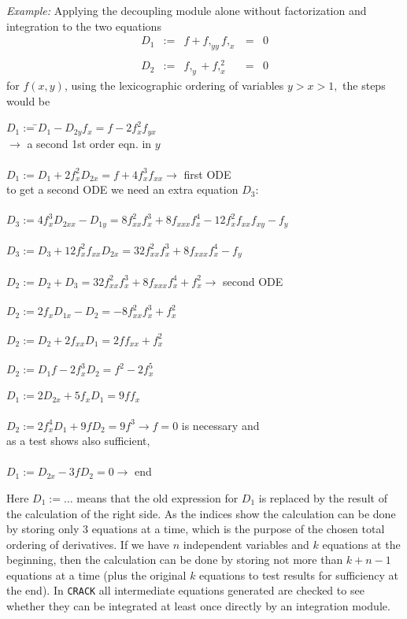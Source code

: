 {\em Example:}
Applying the decoupling module alone without factorization and integration
to the two equations
\[ \begin{array}{rclcl}
 D_1 & := & f + f,_{yy}f,_x & = & 0 \\ \\
 D_2 & := & f,_y + f,_x^2   & = & 0
\end{array} \]
for $f(x,y)$, using the lexicographic ordering of variables $y>x>1,$
the steps would be
\begin{tabbing}
$D_1:=$\=$D_1-D_{2y}f_x=f-2f_x^2f_{yx}$ \\
     \> $\rightarrow$  a second 1st order eqn. in $y$\\ \\
$D_1:=$\>$D_1+2f_x^2D_{2x}=f+4f_x^3f_{xx} \rightarrow$  first ODE \\
     \> to get a second ODE we need an extra equation $D_3:$ \\ \\
$D_3:=$\>$4f_x^3D_{2xx}-D_{1y}=8f_{xx}^2f_x^3+8f_{xxx}f_x^4-12f_x^2f_{xx}f_{xy}
-f_y$ \\ \\
$D_3:=$\>$D_3+12f_x^2f_{xx}D_{2x}=32f_{xx}^2f_x^3+8f_{xxx}f_x^4-f_y$
\\ \\
$D_2:=$\>$D_2+D_3=32f_{xx}^2f_x^3+8f_{xxx}f_x^4+f_x^2 \rightarrow$
second ODE \\ \\
$D_2:=$\>$2f_xD_{1x}-D_2=-8f_{xx}^2f_x^3+f_x^2$ \\ \\
$D_2:=$\>$D_2+2f_{xx}D_1=2ff_{xx}+f_x^2$ \\ \\
$D_2:=$\>$D_1f-2f_x^3D_2=f^2-2f_x^5$ \\ \\
$D_1:=$\>$2D_{2x}+5f_xD_1=9ff_x$ \\ \\
$D_2:=$\>$2f_x^4D_1+9fD_2=9f^3 \rightarrow f=0$ is necessary and \\
     \> as a test shows also sufficient, \\ \\
$D_1:=$\>$D_{2x}-3fD_2=0 \rightarrow$ end
\end{tabbing}
Here $D_1:=\ldots$ means that the old expression for $D_1$ is replaced
by the result of the calculation of the right side. As the indices
show the calculation can be done by storing only 3 equations at a time,
which is the purpose of the chosen total ordering of derivatives. If
we have $n$ independent variables and $k$ equations at the beginning,
then the calculation can be done by storing not more than $k+n-1$
equations at a time (plus the original $k$ equations to test results for
sufficiency at the end).
In {\tt CRACK} all intermediate equations generated are checked to see
whether they can be integrated at least once directly by an integration
module.

